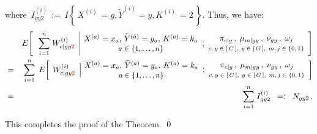 \begin{enumerate}
\begin{eqnarray*}
	\end{eqnarray*}
	where \,$I^{(i)}_{gy2} \,:=\, I\!\left\{\,X^{(i)}\,=g , \widetilde{Y}^{(i)}=y , K^{(i)}\,=2\,\right\}$.
	Thus, we have:
	\begin{eqnarray*}
	&&
		E\!\left[\;\;
			\left.
			\overset{n}{\underset{i=1}{\sum}} \; W^{(i)}_{c \vert gy{\color{red}2}}
			\,\;\right\vert
			\!\!
			\EMConditionsWithValues
		\right]
	\\
	&=&
		\overset{n}{\underset{i=1}{\sum}} \;\,
		E\!\left[\;
			\left.
			W^{(i)}_{c \vert gy{\color{red}2}}
			\,\;\right\vert
			\!\!
			\EMConditionsWithValues
		\right]
	\\
	&=&
		\overset{n}{\underset{i=1}{\sum}} \;
		I^{(i)}_{gy2}
	\;\; =: \;\; 
		N_{gy2}\,.
	\end{eqnarray*}
\end{enumerate}
This completes the proof of the Theorem. \qed



\renewcommand{\theenumi}{\roman{enumi}}
\renewcommand{\labelenumi}{\textnormal{(\theenumi)}$\;\;$}

